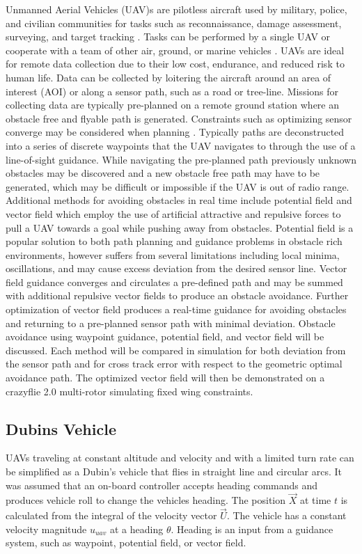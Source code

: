 \documentclass[conf]{new-aiaa}
\begin{document}
Unmanned Aerial Vehicles (UAV)s are pilotless aircraft used by military, police, and civilian communities for tasks such as reconnaissance, damage assessment, surveying, and target tracking \cite{ariyur_autonomous_2008,teuliere_chasing_2011}. Tasks can be performed by a single UAV or cooperate with a team of other air, ground, or marine vehicles \cite{oh_coordinated_2013,hyondong_oh_coordinated_2015,ulun_coordinated_2013}. UAVs are ideal for remote data collection due to their low cost, endurance, and reduced risk to human life. Data can be collected by loitering the aircraft around an area of interest (AOI) or along a sensor path, such as a road or tree-line. Missions for collecting data are typically pre-planned on a remote ground station where an obstacle free and flyable path is generated. Constraints such as optimizing sensor converge may be considered when planning \cite{wilhelm_direct_2017}. Typically paths are deconstructed into a series of discrete waypoints that the UAV navigates to through the use of a line-of-sight guidance. While navigating the pre-planned path previously unknown obstacles may be discovered and a new obstacle free path may have to be generated, which may be difficult or impossible if the UAV is out of radio range. Additional methods for avoiding obstacles in real time include potential field and vector field which employ the use of artificial attractive and repulsive forces to pull a UAV towards a goal while pushing away from obstacles. Potential field is a popular solution to both path planning and guidance problems in obstacle rich environments, however suffers from several limitations including local minima, oscillations, and may cause excess deviation from the desired sensor line. Vector field guidance converges and circulates a pre-defined path and may be summed with additional repulsive vector fields to produce an obstacle avoidance. Further optimization of vector field produces a real-time guidance for avoiding obstacles and returning to a pre-planned sensor path with minimal deviation. Obstacle avoidance using waypoint guidance, potential field, and vector field will be discussed. Each method will be compared in simulation for both deviation from the sensor path and for cross track error with respect to the geometric optimal avoidance path. The optimized vector field will then be demonstrated on a crazyflie 2.0 multi-rotor simulating fixed wing constraints.

\subsection{Dubins Vehicle}
UAVs traveling at constant altitude and velocity and with a limited turn rate can be simplified as a Dubin's vehicle that flies in straight line and circular arcs. It was assumed that an on-board controller accepts heading commands and produces vehicle roll to change the vehicles heading. The position $\overrightarrow{X}$ at time $t$ is calculated from the integral of the velocity vector $\overrightarrow{U}$. The vehicle has a constant velocity magnitude $u_{uav}$ at a heading $\theta$. Heading is an input from a guidance system, such as waypoint, potential field, or vector field.
\end{document}
